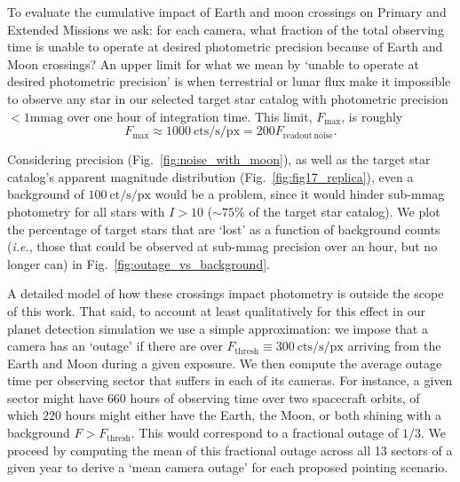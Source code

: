 To evaluate the cumulative impact of Earth and moon crossings on \tesss Primary and Extended Missions we ask: for each camera, what fraction of the total observing time is \tess unable to operate at desired photometric precision because of Earth and Moon crossings?
An upper limit for what we mean by `unable to operate at desired photometric precision' is when terrestrial or lunar flux make it impossible to observe any star in our selected target star catalog with photometric precision $<1 \text{mmag}$ over one hour of integration time.
This limit, $F_\text{max}$, is roughly
\begin{equation*}
 F_\mathrm{max} \approx 1000\mathrm{\ cts/s/px} = 200 F_\mathrm{readout\ noise}.
\end{equation*}

Considering \tesss precision (Fig.~\ref{fig:noise_with_moon}), as well as the target star catalog's apparent magnitude distribution (Fig.~\ref{fig:fig17_replica}), even a background of $100\ \text{ct/s/px}$ would be a problem, since it would hinder sub-mmag photometry for all stars with $I > 10$ ($\sim75\%$ of the target star catalog). We plot the percentage of target stars that are `lost' as a function of background counts (\textit{i.e.}, those that could be observed at sub-mmag precision over an hour, but no longer can) in Fig.~\ref{fig:outage_vs_background}.

A detailed model of how these crossings impact \tess photometry is outside the scope of this work.
That said, to account at least qualitatively for this effect in our planet detection simulation we use a simple approximation: we impose that a camera has an `outage' if there are over $F_\text{thresh}\equiv300\ \text{cts/s/px}$ arriving from the Earth and Moon during a given exposure.
We then compute the average outage time per observing sector that \tess suffers in each of its cameras. 
For instance, a given sector might have $660$ hours of observing time over two spacecraft orbits, of which $220$ hours might either have the Earth, the Moon, or both shining with a background $F > F_\text{thresh}$. 
This would correspond to a fractional outage of $1/3$. 
We proceed by computing the mean of this fractional outage across all 13 sectors of a given year to derive a `mean camera outage' for each proposed pointing scenario.

